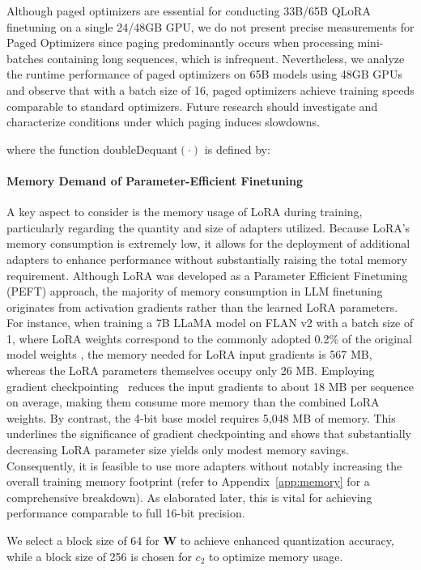 Although paged optimizers are essential for conducting 33B/65B \textsc{QLoRA} finetuning on a single 24/48GB GPU, we do not present precise measurements for Paged Optimizers since paging predominantly occurs when processing mini-batches containing long sequences, which is infrequent. Nevertheless, we analyze the runtime performance of paged optimizers on 65B models using 48GB GPUs and observe that with a batch size of 16, paged optimizers achieve training speeds comparable to standard optimizers. Future research should investigate and characterize conditions under which paging induces slowdowns.

where the function doubleDequant$(\cdot)$ is defined by:

\paragraph{Memory Demand of Parameter-Efficient Finetuning} A key aspect to consider is the memory usage of LoRA during training, particularly regarding the quantity and size of adapters utilized. Because LoRA’s memory consumption is extremely low, it allows for the deployment of additional adapters to enhance performance without substantially raising the total memory requirement. Although LoRA was developed as a Parameter Efficient Finetuning (PEFT) approach, the majority of memory consumption in LLM finetuning originates from activation gradients rather than the learned LoRA parameters. For instance, when training a 7B LLaMA model on FLAN v2 with a batch size of 1, where LoRA weights correspond to the commonly adopted 0.2\% of the original model weights \citep{hu2021lora,liu2022few}, the memory needed for LoRA input gradients is 567 MB, whereas the LoRA parameters themselves occupy only 26 MB. Employing gradient checkpointing~\citep{chen2016training} reduces the input gradients to about 18 MB per sequence on average, making them consume more memory than the combined LoRA weights. By contrast, the 4-bit base model requires 5,048 MB of memory. This underlines the significance of gradient checkpointing and shows that substantially decreasing LoRA parameter size yields only modest memory savings. Consequently, it is feasible to use more adapters without notably increasing the overall training memory footprint (refer to Appendix~\ref{app:memory} for a comprehensive breakdown). As elaborated later, this is vital for achieving performance comparable to full 16-bit precision.

We select a block size of 64 for $\mathbf{W}$ to achieve enhanced quantization accuracy, while a block size of 256 is chosen for $c_2$ to optimize memory usage.

